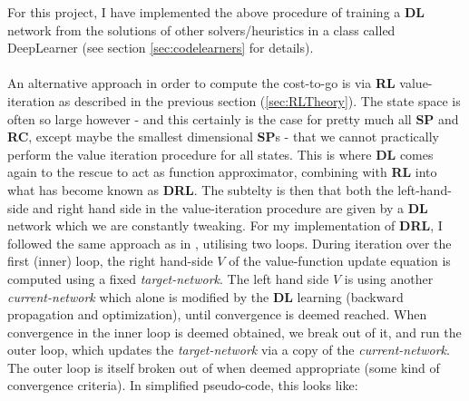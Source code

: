 For this project, I have implemented the above procedure of training a \textbf{DL} network from the solutions of other solvers/heuristics in a class called DeepLearner (see section \ref{sec:codelearners} for details).
\\
\\
An alternative approach in order to compute the cost-to-go is via \textbf{RL} value-iteration as described in the previous section (\ref{sec:RLTheory}). The state space is often so large however - and this certainly is the case for pretty much all \textbf{SP} and \textbf{RC}, except maybe the smallest dimensional \textbf{SP}s - that we cannot practically perform the value iteration procedure for all states. This is where \textbf{DL} comes again to the rescue to act as function approximator, combining with \textbf{RL} into what has become known as \textbf{DRL}. The subtelty is then that both the left-hand-side and right hand side in the value-iteration procedure are given by a \textbf{DL} network which we are constantly tweaking. For my implementation of \textbf{DRL}, I followed the same approach as in \cite{Mnih2013}, utilising two loops. During iteration over the first (inner) loop, the right hand-side $V$ of the value-function update equation is computed using a fixed \textit{target-network}. The left hand side $V$ is using another \textit{current-network} which alone is modified by the \textbf{DL} learning (backward propagation and optimization), until convergence is deemed reached. When convergence in the inner loop is deemed obtained, we break out of it, and run the outer loop, which updates the \textit{target-network} via a copy of the \textit{current-network}. The outer loop is itself broken out of when deemed appropriate (some kind of convergence criteria). In simplified pseudo-code, this looks like:
\\
\\
\teal
